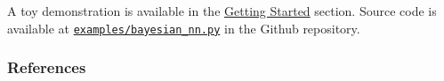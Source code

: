 A toy demonstration is available in the \href{/getting-started}{Getting Started} section.
Source code is available at
\href{https://github.com/blei-lab/edward/blob/master/examples/bayesian_nn.py}
{\texttt{examples/bayesian\_nn.py}} in the Github repository.

\subsubsection{References}\label{references}
